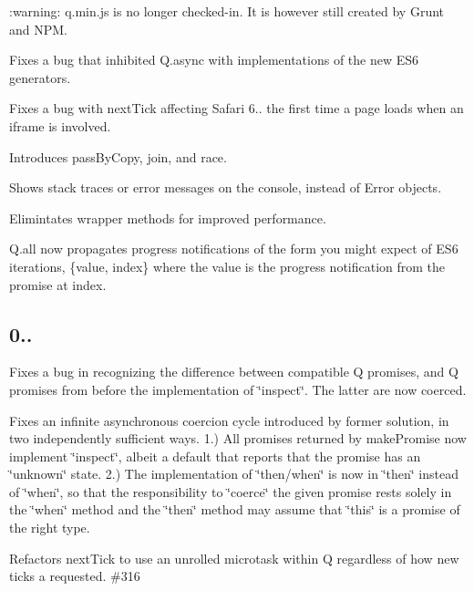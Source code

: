 \begin{DoxyItemize}
\item \+:warning\+: {\ttfamily q.\+min.\+js} is no longer checked-\/in. It is however still created by Grunt and N\+PM.
\item Fixes a bug that inhibited {\ttfamily Q.\+async} with implementations of the new E\+S6 generators.
\item Fixes a bug with {\ttfamily next\+Tick} affecting Safari 6.. the first time a page loads when an {\ttfamily iframe} is involved.
\item Introduces {\ttfamily pass\+By\+Copy}, {\ttfamily join}, and {\ttfamily race}.
\item Shows stack traces or error messages on the console, instead of {\ttfamily Error} objects.
\item Elimintates wrapper methods for improved performance.
\item {\ttfamily Q.\+all} now propagates progress notifications of the form you might expect of E\+S6 iterations, {\ttfamily \{value, index\}} where the {\ttfamily value} is the progress notification from the promise at {\ttfamily index}.
\end{DoxyItemize}

\subsection*{0..}


\begin{DoxyItemize}
\item Fixes a bug in recognizing the difference between compatible Q promises, and Q promises from before the implementation of \char`\"{}inspect\char`\"{}. The latter are now coerced.
\item Fixes an infinite asynchronous coercion cycle introduced by former solution, in two independently sufficient ways. 1.) All promises returned by make\+Promise now implement \char`\"{}inspect\char`\"{}, albeit a default that reports that the promise has an \char`\"{}unknown\char`\"{} state. 2.) The implementation of \char`\"{}then/when\char`\"{} is now in \char`\"{}then\char`\"{} instead of \char`\"{}when\char`\"{}, so that the responsibility to \char`\"{}coerce\char`\"{} the given promise rests solely in the \char`\"{}when\char`\"{} method and the \char`\"{}then\char`\"{} method may assume that \char`\"{}this\char`\"{} is a promise of the right type.
\item Refactors {\ttfamily next\+Tick} to use an unrolled microtask within Q regardless of how new ticks a requested. \#316 
\end{DoxyItemize}

